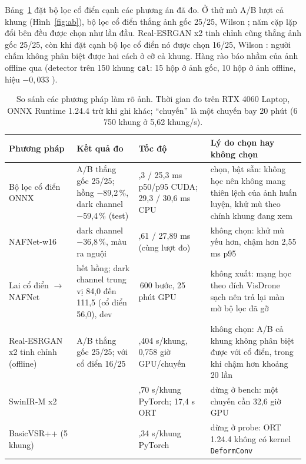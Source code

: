 Bảng~\ref{tab:sosanh} đặt bộ lọc cổ điển cạnh các phương án đã đo. Ở thử mù A/B lượt cả khung (Hình~\ref{fig:ab}), bộ lọc cổ điển thắng ảnh gốc 25/25, Wilson ; năm cặp lặp đổi bên đều được chọn như lần đầu. Real-ESRGAN x2 tinh chỉnh cũng thắng ảnh gốc 25/25, còn khi đặt cạnh bộ lọc cổ điển nó được chọn 16/25, Wilson : người chấm không phân biệt được hai cách ở cỡ cả khung. Hàng rào báo nhầm của ảnh offline qua (detector trên 150 khung \texttt{cal}: 15 hộp ở ảnh gốc, 10 hộp ở ảnh offline, hiệu $-0{,}033$ ).

\begin{table}[!htbp]
\centering\footnotesize
\caption[So sánh các phương pháp làm rõ ảnh]{So sánh các phương pháp làm rõ ảnh. Thời gian đo trên RTX 4060 Laptop, ONNX Runtime 1.24.4 trừ khi ghi khác; ``chuyến'' là một chuyến bay 20 phút (6\,750 khung ở 5,62 khung/s).}
\label{tab:sosanh}
\begin{tabularx}{\textwidth}{@{}>{\raggedright\arraybackslash}p{2.7cm} >{\raggedright\arraybackslash}p{3.3cm} >{\raggedright\arraybackslash}p{3.0cm} X@{}}
\toprule
Phương pháp & Kết quả đo & Tốc độ & Lý do chọn hay không chọn \\
\midrule
Bộ lọc cổ điển ONNX & A/B thắng gốc 25/25; hồng $-$89,2\,\%, dark channel $-$59,4\,\% (test) & 19,3 / 25,3 ms p50/p95 CUDA; 29,3 / 30,6 ms CPU & chọn, bật sẵn: không học nên không mang thiên lệch của ảnh huấn luyện, khử mù theo chính khung đang xem \\
\addlinespace
NAFNet-w16 & dark channel $-$36,8\,\%, màu ra nguội & 20,61 / 27,89 ms (cùng lượt đo) & không chọn: khử mù yếu hơn, chậm hơn 2,55 ms p95 \\
\addlinespace
Lai cổ điển $\to$ NAFNet & hết hồng; dark channel trung vị 84,0 đến 111,5 (cổ điển 56,0), dev & 7\,600 bước, 25 phút GPU & không xuất: mạng học theo đích VisDrone sạch nên trả lại màn mờ bộ lọc đã gỡ \\
\addlinespace
Real-ESRGAN x2 tinh chỉnh (offline) & A/B thắng gốc 25/25; với cổ điển 16/25 & 0,404 s/khung, 0,758 giờ GPU/chuyến & không chọn: A/B cả khung không phân biệt được với cổ điển, trong khi chậm hơn khoảng 20 lần \\
\addlinespace
SwinIR-M x2 & & 2,70 s/khung PyTorch; 17,4 s ORT & dừng ở bench: một chuyến cần 32,6 giờ GPU \\
\addlinespace
BasicVSR++ (5 khung) & & 3,34 s/khung PyTorch & dừng ở probe: ORT 1.24.4 không có kernel \texttt{DeformConv} \\
\bottomrule
\end{tabularx}
\end{table}

